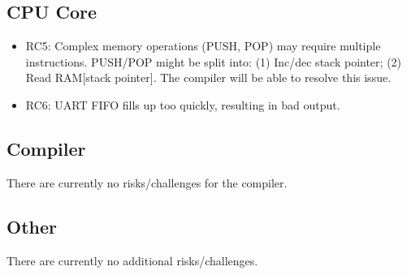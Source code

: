 \documentclass[11pt,a4paper]{article}
\begin{document}
\subsection{CPU Core}
\begin{itemize}
\item{{\color{purple} RC5: Complex memory operations (PUSH, POP) may require multiple instructions. PUSH/POP might be split into: (1) Inc/dec stack pointer; (2) Read RAM[stack pointer]. The compiler will be able to resolve this issue.}}
\item{
{\color{orange} RC6: UART FIFO fills up too quickly, resulting in bad output.}
}
\end{itemize}


\subsection{Compiler}
There are currently no risks/challenges for the compiler.

\subsection{Other}
There are currently no additional risks/challenges.


\newpage
 
\end{document}
